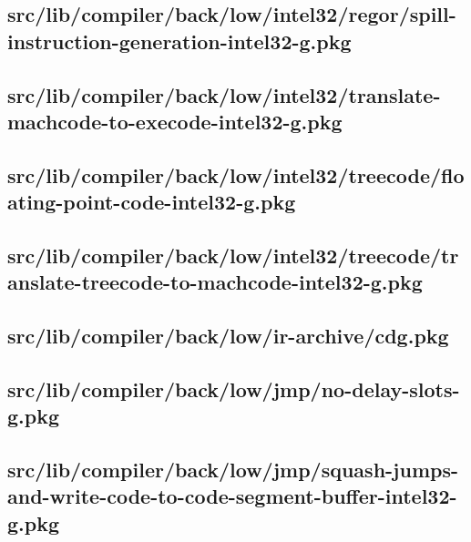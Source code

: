 \subsection{src/lib/compiler/back/low/intel32/regor/spill-instruction-generation-intel32-g.pkg}


\subsection{src/lib/compiler/back/low/intel32/translate-machcode-to-execode-intel32-g.pkg}


\subsection{src/lib/compiler/back/low/intel32/treecode/floating-point-code-intel32-g.pkg}


\subsection{src/lib/compiler/back/low/intel32/treecode/translate-treecode-to-machcode-intel32-g.pkg}


\subsection{src/lib/compiler/back/low/ir-archive/cdg.pkg}


\subsection{src/lib/compiler/back/low/jmp/no-delay-slots-g.pkg}


\subsection{src/lib/compiler/back/low/jmp/squash-jumps-and-write-code-to-code-segment-buffer-intel32-g.pkg}


